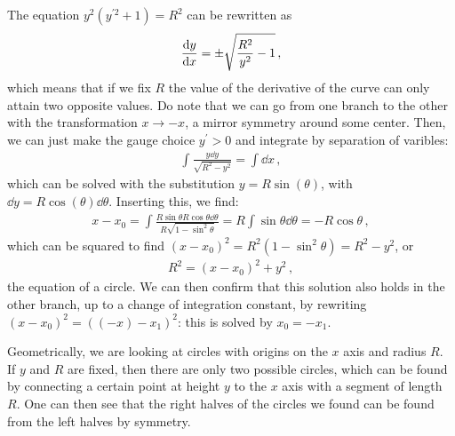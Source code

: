 \documentclass[main.tex]{subfiles}
\begin{document}
The equation \(y^2 (y^{\prime 2}+1) = R^2\) can be rewritten as 
%
\begin{align}
  \dv{y}{x} = \pm \sqrt{\frac{R^2}{y^2} - 1}
\,,
\end{align}
%
which means that if we fix \(R\) the value of the derivative of the curve can only attain two opposite values. Do note that we can go from one branch to the other with the transformation \(x \rightarrow -x\), a mirror symmetry around some center.
Then, we can just make the gauge choice \(y^{\prime }>0\) and integrate by separation of varibles: 
%
\begin{align}
  \int \frac{y \dd{y}}{\sqrt{R^2-y^2}} = \int \dd{x}
\,,
\end{align}
%
which can be solved with the substitution \( y = R \sin(\theta )\), with \(\dd{y} = R \cos(\theta ) \dd{\theta }\). Inserting this, we find: 
%
\begin{align}
  x - x_0  = \int \frac{R \sin\theta R \cos\theta  \dd{\theta }}{R \sqrt{1 - \sin^2 \theta }} 
  = R \int \sin \theta  \dd{\theta } = - R \cos \theta 
\,,
\end{align}
%
which can be squared to find \((x- x_0 )^2 = R^2 (1 - \sin^2 \theta ) = R^2 - y^2\), or 
%
\begin{align}
  R^2 = (x-x_0  )^2 + y^2
\,,
\end{align}
%
the equation of a circle.
We can then confirm that this solution also holds in the other branch, up to a change of integration constant, by rewriting \((x- x_0 )^2 = ((-x) - x_1 )^2\): this is solved by \(x_0 = - x_1 \). 

Geometrically, we are looking at circles with origins on the \(x\) axis and radius \(R\). If \(y\) and \(R\) are fixed, then there are only two possible circles, which can be found by connecting a certain point at height \(y\) to the \(x\) axis with a segment of length \(R\).
One can then see that the right halves of the circles we found can be found from the left halves by symmetry.
\end{document}
